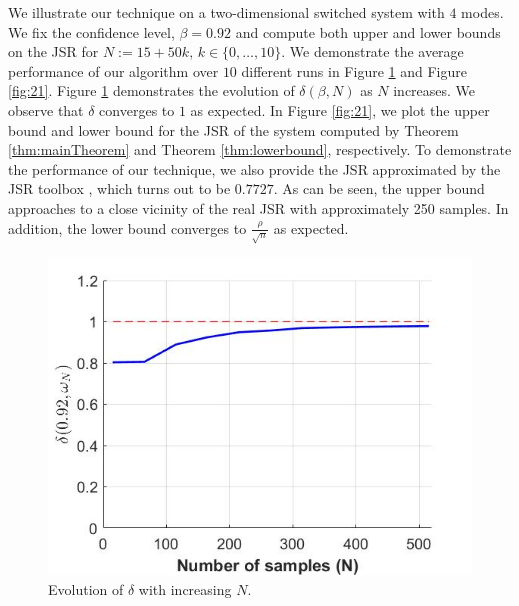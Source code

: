 We illustrate our technique on a two-dimensional switched system with $4$ modes. We fix the confidence level, \mbox{$\beta = 0.92$} and compute both upper and lower bounds on the JSR for $N:=15+50k,\, k \in\{0, \ldots, 10\}.$ We demonstrate the average performance of our algorithm over $10$ different runs in Figure \ref{fig:11} and Figure \ref{fig:21}. Figure \ref{fig:11} demonstrates the evolution of $\delta(\beta, N)$ as $N$ increases. We observe that $\delta$ converges to $1$ as expected. In Figure \ref{fig:21}, we plot the upper bound and lower bound for the JSR of the system computed by Theorem \ref{thm:mainTheorem} and Theorem \ref{thm:lowerbound}, respectively. To demonstrate the performance of our technique, we also provide the JSR approximated by the JSR toolbox \cite{jsrtoolbox}, which turns out to be $0.7727$. As can be seen, the upper bound approaches to a close vicinity of the real JSR with approximately 250 samples. In addition, the lower bound converges to $\frac{\rho}{\sqrt{n}}$ as expected.

\begin{figure}
\begin{center}
\includegraphics[trim = 5mm 5mm 5mm 5mm, scale=0.35]{delta1.jpg}

\caption{Evolution of $\delta$ with increasing $N$.}
\label{fig:11}
\end{center}
\end{figure}

